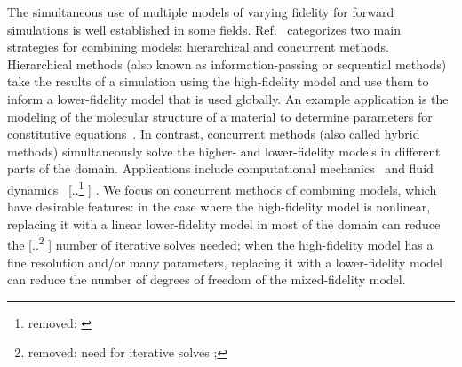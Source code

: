 \documentclass[review]{siamart0516}
\providecommand{\DIFaddtex}[1]{{\protect\color{blue} \sf #1}} %
\providecommand{\DIFdeltex}[1]{{\protect\color{red} [..\footnote{removed: #1} ]}} %
\providecommand{\DIFaddbegin}{} %
\providecommand{\DIFaddend}{} %
\providecommand{\DIFdelbegin}{} %
\providecommand{\DIFdelend}{} %
\providecommand{\DIFadd}[1]{\texorpdfstring{\DIFaddtex{#1}}{#1}} %
\providecommand{\DIFdel}[1]{\texorpdfstring{\DIFdeltex{#1}}{}} %
\newcommand{\DIFscaledelfig}{0.5}
\newlength{\DIFdelgraphicswidth} %
\newlength{\DIFdelgraphicsheight} %
\newcommand{\DIFaddincludegraphics}[2][]{{\color{blue}\fbox{\DIFOincludegraphics[#1]{#2}}}} %
\newcommand{\DIFdelincludegraphics}[2][]{%
\sbox{\DIFdelgraphicsbox}{\DIFOincludegraphics[#1]{#2}}%
\settoboxwidth{\DIFdelgraphicswidth}{\DIFdelgraphicsbox} %
\settoboxtotalheight{\DIFdelgraphicsheight}{\DIFdelgraphicsbox} %
\scalebox{\DIFscaledelfig}{%
\parbox[b]{\DIFdelgraphicswidth}{\usebox{\DIFdelgraphicsbox}\\[-\baselineskip] \rule{\DIFdelgraphicswidth}{0em}}\llap{\resizebox{\DIFdelgraphicswidth}{\DIFdelgraphicsheight}{%
\setlength{\unitlength}{\DIFdelgraphicswidth}%
\begin{picture}(1,1)%
\thicklines\linethickness{2pt} %
{\color[rgb]{1,0,0}\put(0,0){\framebox(1,1){}}}%
{\color[rgb]{1,0,0}\put(0,0){\line( 1,1){1}}}%
{\color[rgb]{1,0,0}\put(0,1){\line(1,-1){1}}}%
\end{picture}%
}\hspace*{3pt}}} %
} %
\DeclareRobustCommand{\DIFaddbegin}{\DIFOaddbegin \let\includegraphics\DIFaddincludegraphics} %
\DeclareRobustCommand{\DIFaddend}{\DIFOaddend \let\includegraphics\DIFOincludegraphics} %
\DeclareRobustCommand{\DIFdelbegin}{\DIFOdelbegin \let\includegraphics\DIFdelincludegraphics} %
\DeclareRobustCommand{\DIFdelend}{\DIFOaddend \let\includegraphics\DIFOincludegraphics} %
\begin{document}
The simultaneous use of multiple models of varying fidelity for forward simulations is well established in some fields. Ref.~\cite{Liuetal03} categorizes two main strategies for combining models: hierarchical and concurrent methods. Hierarchical methods (also known as information-passing or sequential methods) take the results of a simulation using the high-fidelity model and use them to inform a lower-fidelity model that is used globally. An example application is the modeling of the molecular structure of a material to determine parameters for constitutive equations~\cite{Haoetal03,Weietal04}. In contrast, concurrent methods \DIFaddbegin \DIFadd{(also called hybrid methods) }\DIFaddend simultaneously solve the higher- and lower-fidelity models in different parts of the domain. Applications include computational mechanics~\cite{Khareetal08,Prudetal08} and fluid dynamics~\DIFdelbegin \DIFdel{\cite{vanOpstaletal15,LucKinBer02,FatGerQua01}}\DIFdelend \DIFaddbegin \DIFadd{\cite{AlexGarTar02,FatGerQua01,Garcetal99,LucKinBer02,vanOpstaletal15,WadErw90}}\DIFaddend .
We focus on concurrent methods of combining models, which have desirable features: in the case where the high-fidelity model is nonlinear, replacing it with a linear lower-fidelity model in most of the domain can reduce the \DIFdelbegin \DIFdel{need for iterative solves ;
}\DIFdelend \DIFaddbegin \DIFadd{number of iterative solves needed; }\DIFaddend when the high-fidelity model has a fine resolution and/or many parameters, replacing it with a lower-fidelity model can reduce the number of degrees of freedom of the mixed-fidelity model.
\end{document}
